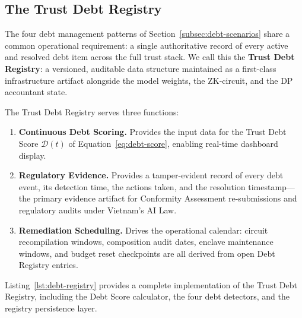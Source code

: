 \subsection{The Trust Debt Registry}
\label{sec:trust-debt-registry}

The four debt management patterns of
Section~\ref{subsec:debt-scenarios} share a common
operational requirement: a single authoritative record of
every active and resolved debt item across the full trust
stack.
We call this the \textbf{Trust Debt Registry}: a versioned,
auditable data structure maintained as a first-class
infrastructure artifact alongside the model weights, the
ZK-circuit, and the DP accountant state.

The Trust Debt Registry serves three functions:

\begin{enumerate}
  \item \textbf{Continuous Debt Scoring.}
    Provides the input data for the Trust Debt Score
    $\mathcal{D}(t)$ of
    Equation~\eqref{eq:debt-score}, enabling real-time
    dashboard display.

  \item \textbf{Regulatory Evidence.}
    Provides a tamper-evident record of every debt event,
    its detection time, the actions taken, and the
    resolution timestamp---the primary evidence artifact
    for Conformity Assessment re-submissions and regulatory
    audits under Vietnam's AI Law.

  \item \textbf{Remediation Scheduling.}
    Drives the operational calendar: circuit recompilation
    windows, composition audit dates, enclave maintenance
    windows, and budget reset checkpoints are all derived
    from open Debt Registry entries.
\end{enumerate}

Listing~\ref{lst:debt-registry} provides a complete
implementation of the Trust Debt Registry, including the
Debt Score calculator, the four debt detectors, and the
registry persistence layer.

